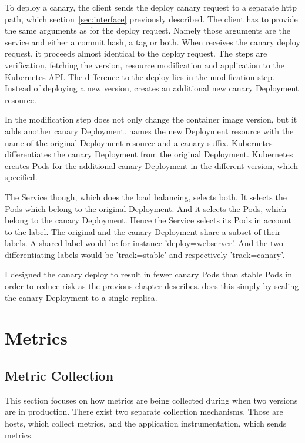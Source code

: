 To deploy a canary, the client sends the deploy canary request to a separate \gls{http} path,
which section~\ref{sec:interface} previously described. The client has to provide the
same arguments as for the deploy request. Namely those arguments are the service and
either a commit hash, a tag or both. When \deployer{} receives the canary deploy request, it
proceeds almost identical to the deploy request. The steps are verification, fetching the
version, resource modification and application to the Kubernetes API. The difference to
the deploy lies in the modification step. Instead of deploying a new version, \deployer{}
creates an additional new canary Deployment resource.

In the modification step \deployer{} does not only change the container image version, but
it adds another canary Deployment. \deployer{} names the new Deployment resource with the
name of the original Deployment resource and a canary suffix. Kubernetes differentiates
the canary Deployment from the original Deployment. Kubernetes creates Pods for the
additional canary Deployment in the different version, which \deployer{} specified.

The Service though, which does the load balancing, selects both. It selects the Pods which
belong to the original Deployment. And it selects the Pods, which belong to the canary
Deployment. Hence the Service selects its Pods in account to the label. The original and
the canary Deployment share a subset of their labels. A shared label would be for instance
'deploy=webserver'. And the two differentiating labels would be 'track=stable' and
respectively 'track=canary'.

I designed the canary deploy to result in fewer canary Pods than stable Pods in order to
reduce risk as the previous chapter describes. \deployer{} does this simply by scaling the
canary Deployment to a single replica.

\section{Metrics}

\subsection{Metric Collection}

This section focuses on how metrics are being collected during when two versions are in
production. There exist two separate collection mechanisms. Those are hosts, which collect
metrics, and the application instrumentation, which sends metrics.

